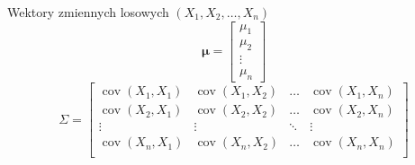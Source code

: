 \documentclass{mp}
\DeclareMathOperator{\cov}{cov}
\begin{document}
\begin{frame}{Wektory zmiennych losowych $(X_1,X_2,\ldots,X_n)$}
\[ \bm{\mu}=\begin{bmatrix} \mu_1 \\ \mu_2 \\ \vdots \\ \mu_n \end{bmatrix} \]
\[ \Sigma=\begin{bmatrix}
\cov(X_1,X_1) & \cov(X_1,X_2) & \ldots & \cov(X_1,X_n) \\
\cov(X_2,X_1) & \cov(X_2,X_2) & \ldots & \cov(X_2,X_n) \\
\vdots & \vdots & \ddots & \vdots \\
\cov(X_n,X_1) & \cov(X_n,X_2) & \ldots & \cov(X_n,X_n) \\
\end{bmatrix} \]
\end{frame}


\end{document}

